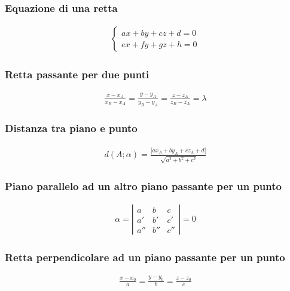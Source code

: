 \documentclass[a4paper]{article}
\begin{document}
	\subsubsection*{Equazione di una retta}
	\begin{align*}
		\begin{cases}
		ax+by+cz+d=0\\
		ex+fy+gz+h=0
		\end{cases}
	\end{align*}

	\subsubsection*{Retta passante per due punti}
	\begin{align*}
		\frac{x - x_A}{x_B - x_A} = \frac{y - y_A}{y_B - y_A} = \frac{z - z_A}{z_B - z_A} = \lambda
	\end{align*}

	\subsubsection*{Distanza tra piano e punto}
	\begin{align*}
		d(A ; \alpha) = \frac{|ax_A + by_A + cz_A + d|}{\sqrt{a^2+b^2+c^2}}
	\end{align*}
	
	\subsubsection*{Piano parallelo ad un altro piano passante per un punto}
	
	\begin{align*}
	\alpha = \left|
		\begin{array}{ccc}
			a & b & c \\ 
			a' & b' & c' \\ 
			a'' & b'' & c''
		\end{array}
		\right| = 0 
	\end{align*}
		
	\subsubsection*{Retta perpendicolare ad un piano passante per un punto}
	
	\begin{align*}
		\frac{x-x_0}{a} = \frac{y-y_0}{b} = \frac{z-z_0}{c}
	\end{align*}
	
\end{document}
